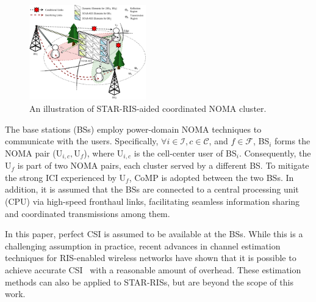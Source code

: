 \documentclass[conference]{IEEEtran}
\begin{document}
\begin{figure}[t]
    \centerline{
        \includegraphics[width=0.45\textwidth]{figs/system.pdf}}
    \caption{An illustration of STAR-RIS-aided coordinated NOMA cluster.}
    \label{fig:system}
\end{figure}

The base stations (BSs) employ power-domain NOMA techniques to communicate with the users. Specifically, $\forall i \in \mathcal{I}, c \in \mathcal{C}$, and $f \in \mathcal{F}$, BS$_i$ forms the NOMA pair (${\text{U}_{i,c}, \text{U}_f}$), where $\text{U}_{i,c}$ is the cell-center user of BS$_i$. Consequently, the U$_f$ is part of two NOMA pairs, each cluster served by a different BS. To mitigate the strong ICI experienced by U$_f$, CoMP is adopted between the two BSs. In addition, it is assumed that the BSs are connected to a central processing unit (CPU) via high-speed fronthaul links, facilitating seamless information sharing and coordinated transmissions among them.

In this paper, perfect CSI is assumed to be available at the BSs. While this is a challenging assumption in practice, recent advances in channel estimation techniques for RIS-enabled wireless networks have shown that it is possible to achieve accurate CSI~\cite{hou2021joint, wei2021channel, taha2021enabling} with a reasonable amount of overhead. These estimation methods can also be applied to STAR-RISs, but are beyond the scope of this work.
\end{document}

